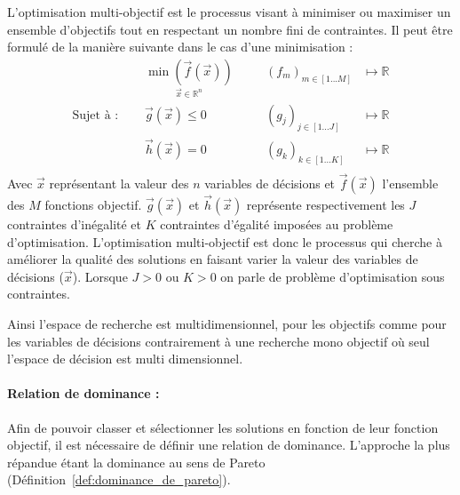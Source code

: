 \begin{Def}\label{def:optimisation_multi_objectif}
L’optimisation multi-objectif est le processus visant à minimiser ou maximiser un ensemble
d’objectifs tout en respectant un nombre fini de contraintes.
Il peut être formulé de la manière suivante dans le cas d’une minimisation :
\begin{equation}\label{eq:def_optimisation}
  \begin{aligned}
                           & \underset{\vec{x} \in \mathbb{R}^{n}}{\min(\vec{f}(\vec{x}))}& & \quad (f_{m})_{m \in [1 ... M]} & \longmapsto \mathbb{R} \\
    \text{Sujet à : }\quad & \vec{g}(\vec{x}) \leqslant 0                                 & & \quad (g_{j})_{j \in [1 ... J]} & \longmapsto \mathbb{R} \\
                           & \vec{h}(\vec{x}) = 0                                         & & \quad (g_{k})_{k \in [1 ... K]} & \longmapsto \mathbb{R} \\
  \end{aligned}
\end{equation}
Avec $\vec{x}$ représentant la valeur des $n$ variables de décisions et $\vec{f}(\vec{x})$
l’ensemble des $M$ fonctions objectif.  $\vec{g}(\vec{x})$ et $\vec{h}(\vec{x})$ représente
respectivement les $J$ contraintes d’inégalité et $K$ contraintes d’égalité imposées au problème
d’optimisation. L’optimisation multi-objectif est donc le processus qui cherche à améliorer la
qualité des solutions en faisant varier la valeur des variables de décisions ($\vec{x}$).
Lorsque $J > 0$ ou $K > 0$ on parle de problème d’optimisation sous contraintes.
\end{Def}
Ainsi l’espace de recherche est multidimensionnel, pour les objectifs comme pour
les variables de décisions contrairement à une recherche mono objectif où seul
l’espace de décision est multi dimensionnel.

\paragraph{Relation de dominance :} %
\label{par:relation_de_dominance}
Afin de pouvoir classer et sélectionner les solutions en fonction de leur fonction
objectif, il est nécessaire de définir une relation de dominance.
L’approche la plus répandue étant la dominance au sens de Pareto (Définition~\ref{def:dominance_de_pareto}).

